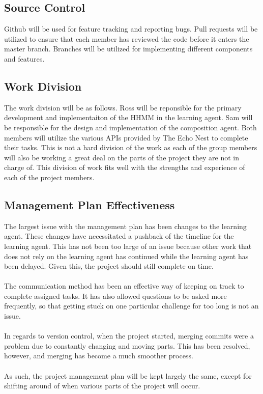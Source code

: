 \documentclass{article}
\begin{document}
\subsection{Source Control}
Github will be used for feature tracking and reporting bugs.  Pull requests will be utilized to 
ensure that each member has reviewed the code before it enters the master branch.  Branches will 
be utilized for implementing different components and features.

\subsection{Work Division}
The work division will be as follows. Ross will be reponsible for the primary development and 
implementaiton of the HHMM in the learning agent. Sam will be responsible for the design and 
implementation of the composition agent. Both members will utilize the various APIs provided by
The Echo Nest to complete their tasks.  This is not a hard division of the work as each of 
the group members will also be working a great deal on the parts of the project they are not in
charge of. This division of work fits well with the strengths and experience of each of the 
project members.

\subsection{Management Plan Effectiveness}
The largest issue with the management plan has been changes to the learning agent. These changes have
necessitated a pushback of the timeline for the learning agent. This has not been too large of an issue
because other work that does not rely on the learning agent has continued while the learning agent has
been delayed. Given this, the project should still complete on time.\\
\\
The communication method has been an effective way of keeping on track to complete assigned tasks. 
It has also allowed questions to be asked more frequently, so that getting stuck on one particular 
challenge for too long is not an issue.\\
\\
In regards to version control, when the project started, merging commits were a problem due to constantly 
changing and moving parts. This has been resolved, however, and merging has become a much smoother process.\\
\\
As such, the project management plan will be kept largely the same, except for shifting around of when 
various parts of the project will occur.
\end{document}
